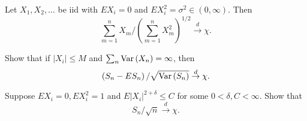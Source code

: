 \begin{exercise}
	Let $X_{1},X_{2},\ldots$ be iid with $EX_{i}=0$ and $EX_{i}^{2}=\sigma^{2}\in(0,\infty)$. Then
	\begin{equation*}
		\sum_{m=1}^{n}X_{m}/\left(\sum_{m=1}^{n}X_{m}^{2}\right)^{1/2}\stackrel{d}{\rightarrow}\chi.
	\end{equation*}
\end{exercise}

\begin{exercise}
	Show that if $\left|X_{i}\right|\leq M$ and $\sum_{n}\mathrm{Var}\left(X_{n}\right)=\infty$, then
	\begin{equation*}
		\left(S_{n}-E S_{n}\right)/\sqrt{\mathrm{Var}\left(S_{n}\right)}\stackrel{d}{\rightarrow}\chi.
	\end{equation*}
\end{exercise}

\begin{exercise}
	Suppose $EX_{i}=0,EX_{i}^{2}=1$ and $E\left|X_{i}\right|^{2+\delta}\leq C$ for some $0<\delta,C<\infty$. Show that
	\begin{equation*}
		S_{n}/\sqrt{n}\stackrel{d}{\rightarrow}\chi.
	\end{equation*}
\end{exercise}
